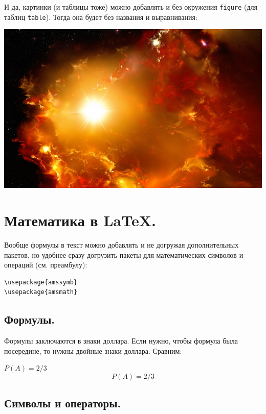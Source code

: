 \documentclass[12pt]{article}
\begin{document}
И да, картинки (и таблицы тоже) можно добавлять и без окружения \texttt{figure} (для таблиц \texttt{table}). Тогда она будет без названия и выравнивания:

\begin{LTXexample}
 \includegraphics[scale=0.15]{desktop.png}
 \end{LTXexample}


\section{Математика в \LaTeX.}

Вообще формулы в текст можно добавлять и не догружая дополнительных пакетов, но удобнее сразу догрузить пакеты для математических символов и операций (см. преамбулу):

\begin{BVerbatim}
\usepackage{amssymb}
\usepackage{amsmath}
 \end{BVerbatim}

\subsection{Формулы.}

Формулы заключаются в знаки доллара. Если нужно, чтобы формула была посередине, то нужны двойные знаки доллара. Сравним:

\begin{LTXexample}
$P(A) = 2/3$ \\ 
$$P(A) = 2/3$$
 \end{LTXexample}

\subsection{Символы и операторы.} 
\end{document}
